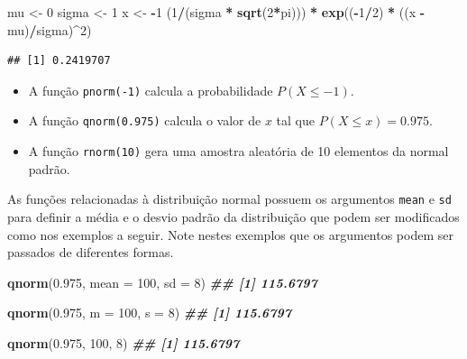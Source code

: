 \documentclass[
]{book}
\newenvironment{Shaded}{\begin{snugshade}}{\end{snugshade}}
\newcommand{\AttributeTok}[1]{\textcolor[rgb]{0.13,0.29,0.53}{#1}}
\newcommand{\DecValTok}[1]{\textcolor[rgb]{0.00,0.00,0.81}{#1}}
\newcommand{\DocumentationTok}[1]{\textcolor[rgb]{0.56,0.35,0.01}{\textbf{\textit{#1}}}}
\newcommand{\FloatTok}[1]{\textcolor[rgb]{0.00,0.00,0.81}{#1}}
\newcommand{\FunctionTok}[1]{\textcolor[rgb]{0.13,0.29,0.53}{\textbf{#1}}}
\newcommand{\NormalTok}[1]{#1}
\newcommand{\OtherTok}[1]{\textcolor[rgb]{0.56,0.35,0.01}{#1}}
\newcommand{\SpecialCharTok}[1]{\textcolor[rgb]{0.81,0.36,0.00}{\textbf{#1}}}
\begin{document}
\begin{Shaded}
\begin{Highlighting}[]
\NormalTok{mu }\OtherTok{\textless{}{-}} \DecValTok{0}
\NormalTok{sigma }\OtherTok{\textless{}{-}} \DecValTok{1}
\NormalTok{x }\OtherTok{\textless{}{-}} \SpecialCharTok{{-}}\DecValTok{1}
\NormalTok{(}\DecValTok{1}\SpecialCharTok{/}\NormalTok{(sigma }\SpecialCharTok{*} \FunctionTok{sqrt}\NormalTok{(}\DecValTok{2}\SpecialCharTok{*}\NormalTok{pi))) }\SpecialCharTok{*} \FunctionTok{exp}\NormalTok{((}\SpecialCharTok{{-}}\DecValTok{1}\SpecialCharTok{/}\DecValTok{2}\NormalTok{) }\SpecialCharTok{*}\NormalTok{ ((x }\SpecialCharTok{{-}}\NormalTok{ mu)}\SpecialCharTok{/}\NormalTok{sigma)}\SpecialCharTok{\^{}}\DecValTok{2}\NormalTok{)}
\end{Highlighting}
\end{Shaded}

\begin{verbatim}
## [1] 0.2419707
\end{verbatim}

\begin{itemize}
\item
  A função \texttt{pnorm(-1)} calcula a probabilidade \(P(X \leq -1)\).
\item
  A função \texttt{qnorm(0.975)} calcula o valor de \(x\) tal que \(P(X\leq x) = 0.975\).
\item
  A função \texttt{rnorm(10)} gera uma amostra aleatória de 10 elementos da normal padrão.
\end{itemize}

As funções relacionadas à distribuição normal possuem os argumentos \texttt{mean} e \texttt{sd} para definir a média e o desvio padrão da distribuição que podem ser modificados como nos exemplos a seguir. Note nestes exemplos que os argumentos podem ser passados de diferentes formas.

\begin{Shaded}
\begin{Highlighting}[]
\FunctionTok{qnorm}\NormalTok{(}\FloatTok{0.975}\NormalTok{, }\AttributeTok{mean =} \DecValTok{100}\NormalTok{, }\AttributeTok{sd =} \DecValTok{8}\NormalTok{)}
\DocumentationTok{\#\# [1] 115.6797}

\FunctionTok{qnorm}\NormalTok{(}\FloatTok{0.975}\NormalTok{, }\AttributeTok{m =} \DecValTok{100}\NormalTok{, }\AttributeTok{s =} \DecValTok{8}\NormalTok{)}
\DocumentationTok{\#\# [1] 115.6797}

\FunctionTok{qnorm}\NormalTok{(}\FloatTok{0.975}\NormalTok{, }\DecValTok{100}\NormalTok{, }\DecValTok{8}\NormalTok{)}
\DocumentationTok{\#\# [1] 115.6797}
\end{Highlighting}
\end{Shaded}
\end{document}
